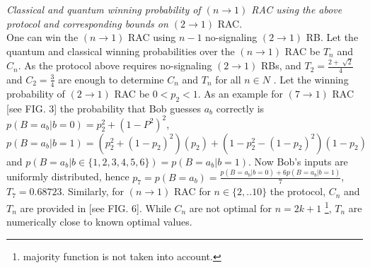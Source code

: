 \textit{Classical and quantum winning probability of $(n\rightarrow1)$ RAC using the above protocol and corresponding bounds on $(2\rightarrow1)$} RAC.\\
One can win the $(n\rightarrow1)$ RAC using $n-1$ no-signaling $(2\rightarrow1)$ RB. Let the quantum and classical winning probabilities over the $(n\rightarrow1)$ RAC be $T_n$ and $C_n$. As the protocol above requires no-signaling $(2\rightarrow1)$ RBs, and  $T_2=\frac{2+\sqrt[]{2}}{4}$ and $C_2=\frac{3}{4}$ are enough to determine $C_n$ and $T_n$ for all $n\in N$ \cite{pawlowski2009information}. Let the winning probability of $(2\rightarrow1)$ RAC be $0<p_2<1$. As an example for $(7\rightarrow1)$ RAC [see FIG. 3] the probability that Bob guesses $a_b$ correctly is $p(B=a_b|b=0)=p_2^2+(1-P^2)^2$,$p(B=a_b|b=1)=(p_2^2+(1-p_2)^2)(p_2)+(1-p_2^2-(1-p_2)^2)(1-p_2)$ and $p(B=a_b|b\in \{1,2,3,4,5,6\})=p(B=a_b|b=1)$. Now Bob's inputs are uniformly distributed, hence $p_7=p(B=a_b)=\frac{p(B=a_b|b=0)+6p(B=a_b|b=1)}{7}$,  $T_7=0.68723$. Similarly, for $(n\rightarrow1)$ RAC for $n\in \{2,..10\}$ the protocol, $C_n$ and $T_n$ are provided in [see FIG. 6]. While $C_n$ are not optimal for $n=2k+1$ \footnote{majority function is not taken into account.}, $T_n$ are numerically close to known optimal values.
